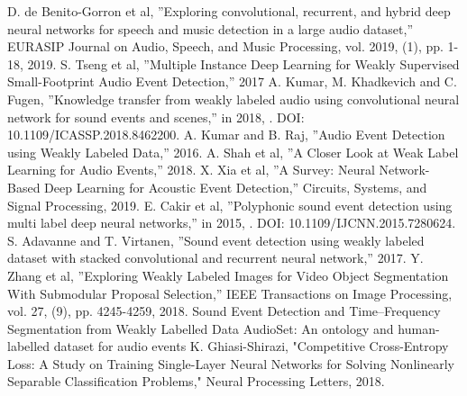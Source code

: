 \documentclass[journal]{IEEEtran}
\begin{document}
\begin{thebibliography}{13}


    D. de Benito-Gorron et al, ”Exploring convolutional, recurrent, and hybrid deep neural networks for speech and music detection in a large audio dataset,” EURASIP Journal on Audio, Speech, and Music Processing, vol. 2019, (1), pp. 1-18, 2019.
    S. Tseng et al, ”Multiple Instance Deep Learning for Weakly Supervised
    Small-Footprint Audio Event Detection,” 2017
    A. Kumar, M. Khadkevich and C. Fugen, ”Knowledge transfer from
weakly labeled audio using convolutional neural network for sound
events and scenes,” in 2018, . DOI: 10.1109/ICASSP.2018.8462200.
    A. Kumar and B. Raj, ”Audio Event Detection using Weakly Labeled
Data,” 2016.
A. Shah et al, ”A Closer Look at Weak Label Learning for Audio
Events,” 2018.
X. Xia et al, ”A Survey: Neural Network-Based Deep Learning for
Acoustic Event Detection,” Circuits, Systems, and Signal Processing,
2019.
E. Cakir et al, ”Polyphonic sound event detection using multi label deep
neural networks,” in 2015, . DOI: 10.1109/IJCNN.2015.7280624.
S. Adavanne and T. Virtanen, ”Sound event detection using weakly
labeled dataset with stacked convolutional and recurrent neural network,”
2017.
Y. Zhang et al, ”Exploring Weakly Labeled Images for Video Object
Segmentation With Submodular Proposal Selection,” IEEE Transactions
on Image Processing, vol. 27, (9), pp. 4245-4259, 2018.
Sound Event Detection and Time–Frequency Segmentation from Weakly
Labelled Data
AudioSet: An ontology and human-labelled dataset for audio 
events
K. Ghiasi-Shirazi, "Competitive Cross-Entropy Loss: A Study on Training Single-Layer Neural Networks for Solving Nonlinearly Separable Classification Problems," Neural Processing Letters, 2018.
\end{thebibliography}
\end{document}
